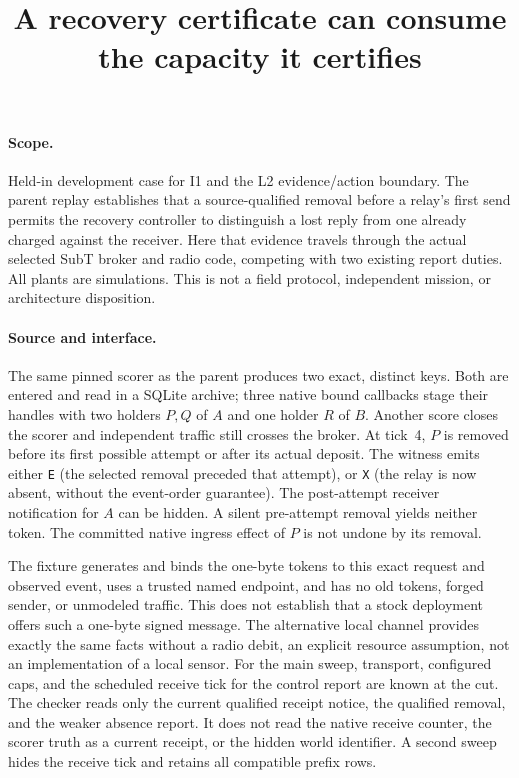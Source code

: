 \documentclass{article}
\title{A recovery certificate can consume the capacity it certifies}
\author{}
\date{}
\begin{document}
\maketitle
\paragraph{Scope.}
Held-in development case for I1 and the L2 evidence/action boundary.
The parent replay establishes that a source-qualified removal before a
relay's first send permits the recovery controller to distinguish a lost
reply from one already charged against the receiver. Here that evidence
travels through the actual selected SubT broker and radio code, competing
with two existing report duties. All plants are simulations. This is
not a field protocol, independent mission, or architecture disposition.

\paragraph{Source and interface.}
The same pinned scorer as the parent produces two exact, distinct
keys. Both are entered and read in a SQLite archive; three native bound
callbacks stage their handles with two holders $P,Q$ of $A$ and one holder
$R$ of $B$. Another score closes the scorer and independent traffic
still crosses the broker. At tick~4, $P$ is removed before its first
possible attempt or after its actual deposit. The witness emits either
\texttt{E} (the selected removal preceded that attempt), or \texttt{X}
(the relay is now absent, without the event-order guarantee). The
post-attempt receiver notification for $A$ can be hidden. A silent
pre-attempt removal yields neither token. The committed native ingress
effect of $P$ is not undone by its removal.

The fixture generates and binds the one-byte tokens to this exact
request and observed event, uses a trusted named endpoint, and has no
old tokens, forged sender, or unmodeled traffic. This does not establish
that a stock deployment offers such a one-byte signed message. The
alternative local channel provides exactly the same facts without a
radio debit, an explicit resource assumption, not an implementation of a
local sensor. For the main sweep, transport, configured caps, and the
scheduled receive tick for the control report are known at the cut.
The checker reads only the current qualified receipt notice, the
qualified removal, and the weaker absence report. It does not read
the native receive counter, the scorer truth as a current receipt,
or the hidden world identifier. A second sweep hides the receive
tick and retains all compatible prefix rows.
\end{document}
